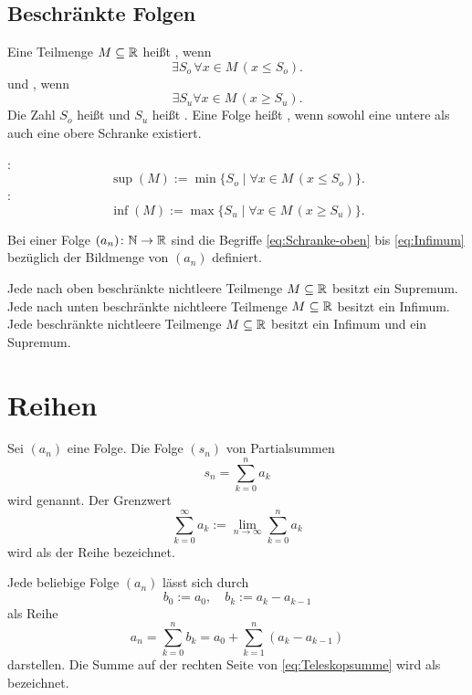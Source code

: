\subsection{Beschränkte Folgen}
{}
Eine Teilmenge $M\subseteq\mathbb R$ heißt ,
wenn
\begin{equation}\label{eq:Schranke-oben}
\exists S_o\,\forall x{\in}M\,(x\le S_o).
\end{equation}
und , wenn
\begin{equation}
\exists S_u\forall x{\in M}\,(x\ge S_u).
\end{equation}
Die Zahl $S_o$ heißt 
und $S_u$ heißt . Eine Folge heißt
, wenn sowohl eine untere als auch
eine obere Schranke existiert.

{} :
\begin{equation}
\sup(M) := \min\{S_o\mid \forall x{\in}M\,(x\le S_o)\}.
\end{equation}
:
\begin{equation}\label{eq:Infimum}
\inf(M) := \max\{S_u\mid \forall x{\in}M\,(x\ge S_u)\}.
\end{equation}

{}
Bei einer Folge $(a_n)\colon\mathbb N\to\mathbb R$ sind die
Begriffe \eqref{eq:Schranke-oben}
bis \eqref{eq:Infimum} bezüglich der Bildmenge
von $(a_n)$ definiert.

Jede nach oben beschränkte nichtleere Teilmenge $M\subseteq\mathbb R$
besitzt ein Supremum.
Jede nach unten beschränkte nichtleere Teilmenge $M\subseteq\mathbb R$
besitzt ein Infimum.
Jede beschränkte nichtleere Teilmenge $M\subseteq\mathbb R$
besitzt ein Infimum und ein Supremum.

\section{Reihen}
\begin{Definition}
Sei $(a_n)$ eine Folge. Die Folge $(s_n)$ von
Partialsummen
\begin{equation}
s_n = \sum_{k=0}^n a_k
\end{equation}
wird  genannt. Der Grenzwert
\begin{equation}
\sum_{k=0}^\infty a_k := \lim_{n\to\infty}\sum_{k=0}^n a_k
\end{equation}
wird als  der Reihe bezeichnet.
\end{Definition}
Jede beliebige Folge $(a_n)$ lässt sich durch
\begin{equation}
b_0:=a_0,\quad b_k:=a_k-a_{k-1}
\end{equation}
als Reihe
\begin{equation}\label{eq:Teleskopsumme}
a_n = \sum_{k=0}^n b_k = a_0+\sum_{k=1}^n (a_k-a_{k-1})
\end{equation}
darstellen. Die Summe auf der rechten Seite von \eqref{eq:Teleskopsumme}
wird als  bezeichnet.


